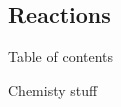 \subsection{Reactions}
\begin{frame}{Table of contents}
    \tableofcontents[currentsubsection]
\end{frame}

\begin{frame}{Chemisty}
    stuff
\end{frame}